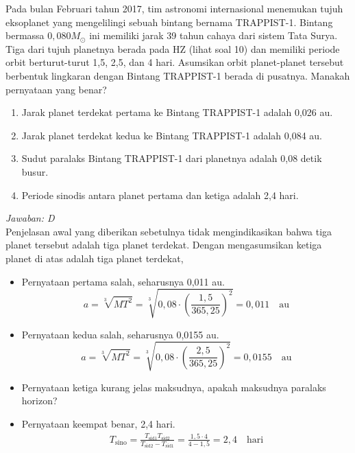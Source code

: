 \documentclass[11pt,fleqn]{exam}
\begin{document}
\begin{questions}
\vspace{0.3cm}
\question Pada bulan Februari tahun 2017, tim astronomi internasional menemukan tujuh eksoplanet yang mengelilingi sebuah bintang bernama TRAPPIST-1. Bintang bermassa $0,080 M_{\odot}$ ini memiliki jarak 39 tahun cahaya dari sistem Tata Surya. Tiga dari tujuh planetnya berada pada HZ (lihat soal 10) dan memiliki periode orbit berturut-turut 1,5, 2,5, dan 4 hari. Asumsikan orbit planet-planet tersebut berbentuk lingkaran dengan Bintang TRAPPIST-1 berada di pusatnya. Manakah pernyataan yang benar?
\begin{enumerate}
\item Jarak planet terdekat pertama ke Bintang TRAPPIST-1 adalah 0,026 au.
\item Jarak planet terdekat kedua ke Bintang TRAPPIST-1 adalah 0,084 au.
\item Sudut paralaks Bintang TRAPPIST-1 dari planetnya adalah 0,08 detik busur.
\item Periode sinodis antara planet pertama dan ketiga adalah 2,4 hari.
\end{enumerate}

\textit{Jawaban: D} \\
Penjelasan awal yang diberikan sebetulnya tidak mengindikasikan bahwa tiga planet tersebut adalah tiga planet terdekat. Dengan mengasumsikan ketiga planet di atas adalah tiga planet terdekat,
\begin{itemize}
\item Pernyataan pertama salah, seharusnya 0,011 au.
\begin{equation*}
a = \sqrt[3]{MT^2} = \sqrt[3]{0,08 \cdot \left(\frac{1,5}{365,25}\right)^2} = 0,011 \quad \text{au}
\end{equation*}
\item Pernyataan kedua salah, seharusnya 0,0155 au.
\begin{equation*}
a = \sqrt[3]{MT^2} = \sqrt[3]{0,08 \cdot \left(\frac{2,5}{365,25}\right)^2} = 0,0155 \quad \text{au}
\end{equation*}
\item Pernyataan ketiga kurang jelas maksudnya, apakah maksudnya paralaks horizon?
\item Pernyataan keempat benar,  2,4 hari.
\begin{eqnarray*}
T_{\text{sino}} = \frac{T_{\text{sid1}} T_{\text{sid2}}}{T_{\text{sid2}} - T_{\text{sid1}}} = \frac{1,5 \cdot 4}{4 - 1,5} = 2,4 \quad \text{hari}
\end{eqnarray*}
\end{itemize}




\end{questions}
\end{document}
